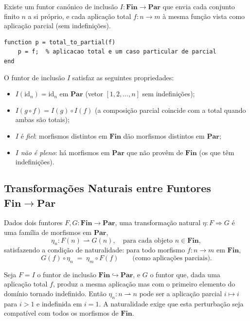Existe um funtor canónico de inclusão $I: \mathbf{Fin} \to \mathbf{Par}$ que envia cada conjunto finito $n$ a si próprio, e cada aplicação total $f: n \to m$ à mesma função vista como aplicação parcial (sem indefinições).

\begin{lstlisting}[style=matlab, caption={Funtor de inclusão $I: \mathbf{Fin} \to \mathbf{Par}$}]
function p = total_to_partial(f)
    p = f;  % aplicacao total e um caso particular de parcial
end
\end{lstlisting}

\begin{proposition}
O funtor de inclusão $I$ satisfaz as seguintes propriedades:
\begin{itemize}
    \item $I(\mathrm{id}_n) = \mathrm{id}_n$ em $\mathbf{Par}$ (vetor $[1, 2, \ldots, n]$ sem indefinições);
    \item $I(g \circ f) = I(g) \circ I(f)$ (a composição parcial coincide com a total quando ambas são totais);
    \item $I$ é \emph{fiel}: morfismos distintos em $\mathbf{Fin}$ dão morfismos distintos em $\mathbf{Par}$;
    \item $I$ \emph{não é pleno}: há morfismos em $\mathbf{Par}$ que não provêm de $\mathbf{Fin}$ (os que têm indefinições).
\end{itemize}
\end{proposition}

\subsection{Transformações Naturais entre Funtores $\mathbf{Fin} \to \mathbf{Par}$}

Dados dois funtores $F, G: \mathbf{Fin} \to \mathbf{Par}$, uma transformação natural $\eta: F \Rightarrow G$ é uma família de morfismos em $\mathbf{Par}$,
\[
    \eta_n: F(n) \rightharpoonup G(n), \quad \text{para cada objeto } n \in \mathbf{Fin},
\]
satisfazendo a condição de naturalidade: para todo morfismo $f: n \to m$ em $\mathbf{Fin}$,
\[
    G(f) \circ \eta_n \;=\; \eta_m \circ F(f) \qquad \text{(como aplicações parciais)}.
\]

\begin{remark}
Seja $F = I$ o funtor de inclusão $\mathbf{Fin} \hookrightarrow \mathbf{Par}$, e $G$ o funtor que, dada uma aplicação total $f$, produz a mesma aplicação mas com o primeiro elemento do domínio tornado indefinido. Então $\eta_n: n \rightharpoonup n$ pode ser a aplicação parcial $i \mapsto i$ para $i > 1$ e indefinida em $i = 1$. A naturalidade exige que esta perturbação seja compatível com todos os morfismos de $\mathbf{Fin}$.
\end{remark}
